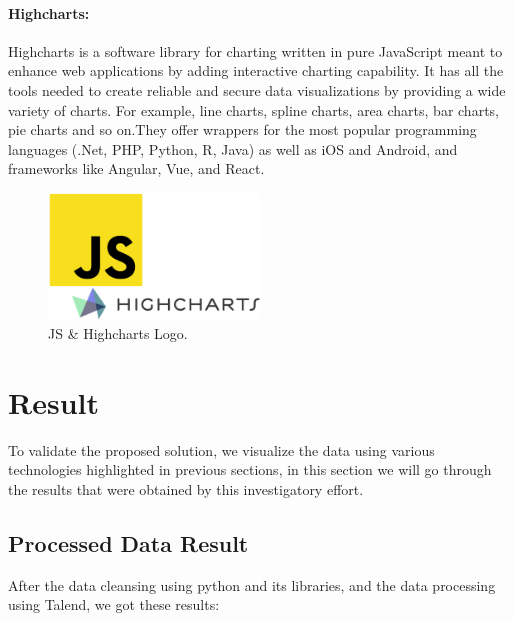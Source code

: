 \paragraph*{Highcharts:}
Highcharts is a software library for charting written in pure JavaScript meant to enhance web applications by adding interactive charting capability. 
It has all the tools needed to create reliable and secure data visualizations by
providing a wide variety of charts. For example, line charts, spline charts, area charts, bar charts, pie charts and so on.They offer wrappers for the most popular programming languages (.Net, PHP, Python, R, Java) as well as iOS and Android, and frameworks like Angular, Vue, and React\cite{InteractiveJavascriptCharts}. 
\begin{figure}[h!]
    \center
    \includegraphics[width=0.50\textwidth]{images/chapter4/jshigh.png}
    \caption{JS \& Highcharts Logo.}
    \label{fig:Highcharts}
\end{figure}

\section{Result}
To validate the proposed solution, we visualize the data  using various technologies highlighted in previous sections, in this section we will go through the results that were obtained by this investigatory effort.
\subsection{Processed Data Result}
After the data cleansing using python and its libraries, and the data processing using Talend, we got these results:


